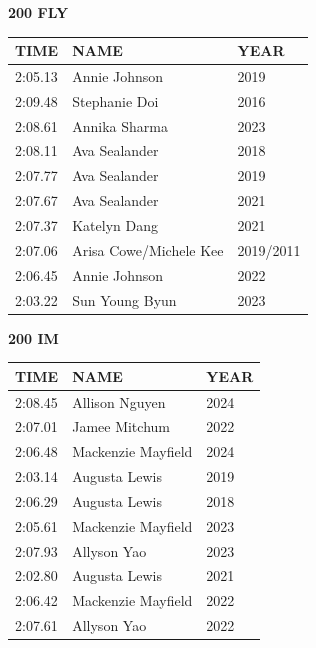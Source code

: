 \begin{table}[H]
\centering
\begin{minipage}[t]{0.48\textwidth}
\centering
\textbf{200 FLY}\\[0.1cm]
\begin{tabular}{@{}p{1.8cm}p{2.8cm}p{1.2cm}@{}}
\hline
    \textbf{TIME} & \textbf{NAME} & \textbf{YEAR} \\
\hline
    2:05.13 & Annie Johnson & 2019 \\
    2:09.48 & Stephanie Doi & 2016 \\
    2:08.61 & Annika Sharma & 2023 \\
    2:08.11 & Ava Sealander & 2018 \\
    2:07.77 & Ava Sealander & 2019 \\
    2:07.67 & Ava Sealander & 2021 \\
    2:07.37 & Katelyn Dang & 2021 \\
    2:07.06 & Arisa Cowe/Michele Kee & 2019/2011 \\
    2:06.45 & Annie Johnson & 2022 \\
    2:03.22 & Sun Young Byun & 2023 \\
\hline
\end{tabular}
\end{minipage}\hfill
\begin{minipage}[t]{0.48\textwidth}
\centering
\textbf{200 IM}\\[0.1cm]
\begin{tabular}{@{}p{1.8cm}p{2.8cm}p{1.2cm}@{}}
\hline
    \textbf{TIME} & \textbf{NAME} & \textbf{YEAR} \\
\hline
    2:08.45 & Allison Nguyen & 2024 \\
    2:07.01 & Jamee Mitchum & 2022 \\
    2:06.48 & Mackenzie Mayfield & 2024 \\
    2:03.14 & Augusta Lewis & 2019 \\
    2:06.29 & Augusta Lewis & 2018 \\
    2:05.61 & Mackenzie Mayfield & 2023 \\
    2:07.93 & Allyson Yao & 2023 \\
    2:02.80 & Augusta Lewis & 2021 \\
    2:06.42 & Mackenzie Mayfield & 2022 \\
    2:07.61 & Allyson Yao & 2022 \\
\hline
\end{tabular}
\end{minipage}
\end{table}

